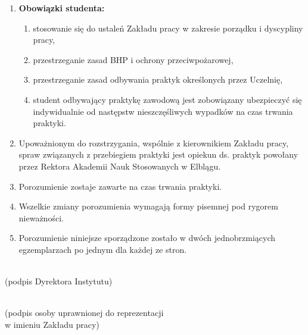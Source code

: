 \documentclass[11pt,a4paper]{article}
\begin{document}
\begin{enumerate}[label=\arabic*., leftmargin=*, itemsep=2pt, parsep=0pt]
    \item \textbf{Obowiązki studenta:}
    \begin{enumerate}[label=\arabic*), itemsep=0pt, parsep=0pt]
        \item stosowanie się do ustaleń Zakładu pracy w zakresie porządku i dyscypliny pracy,
        \item przestrzeganie zasad BHP i ochrony przeciwpożarowej,
        \item przestrzeganie zasad odbywania praktyk określonych przez Uczelnię,
        \item student odbywający praktykę zawodową jest zobowiązany ubezpieczyć się indywidualnie od następstw nieszczęśliwych wypadków na czas trwania praktyki.
    \end{enumerate}

    \item Upoważnionym do rozstrzygania, wspólnie z kierownikiem Zakładu pracy, spraw związanych z przebiegiem praktyki jest opiekun ds. praktyk powołany przez Rektora Akademii Nauk Stosowanych w Elblągu.

    \item Porozumienie zostaje zawarte na czas trwania praktyki.

    \item Wszelkie zmiany porozumienia wymagają formy pisemnej pod rygorem nieważności.

    \item Porozumienie niniejsze sporządzone zostało w dwóch jednobrzmiących egzemplarzach po jednym dla każdej ze stron.
\end{enumerate}

\vspace{2em}
\noindent
\begin{minipage}[t]{0.45\textwidth}
\centering
\dotfill\\
\small (podpis Dyrektora Instytutu)
\end{minipage}
\hfill
\begin{minipage}[t]{0.45\textwidth}
\centering
\dotfill\\
\small (podpis osoby uprawnionej do reprezentacji\\ w imieniu Zakładu pracy)
\end{minipage}
\end{document}
